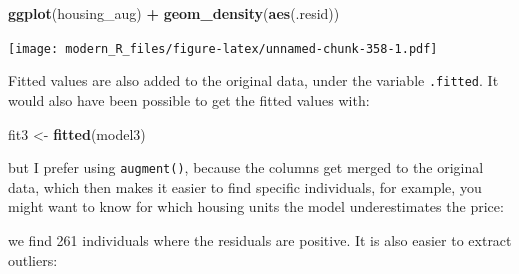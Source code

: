 \documentclass[]{gitbook}
\newenvironment{Shaded}{\begin{snugshade}}{\end{snugshade}}
\newcommand{\DataTypeTok}[1]{\textcolor[rgb]{0.13,0.29,0.53}{#1}}
\newcommand{\DecValTok}[1]{\textcolor[rgb]{0.00,0.00,0.81}{#1}}
\newcommand{\FloatTok}[1]{\textcolor[rgb]{0.00,0.00,0.81}{#1}}
\newcommand{\KeywordTok}[1]{\textcolor[rgb]{0.13,0.29,0.53}{\textbf{#1}}}
\newcommand{\NormalTok}[1]{#1}
\newcommand{\OperatorTok}[1]{\textcolor[rgb]{0.81,0.36,0.00}{\textbf{#1}}}
\newcommand{\StringTok}[1]{\textcolor[rgb]{0.31,0.60,0.02}{#1}}
\theoremstyle{definition}
\theoremstyle{definition}
\theoremstyle{definition}
\theoremstyle{remark}
\begin{document}
\begin{Shaded}
\begin{Highlighting}[]
\KeywordTok{ggplot}\NormalTok{(housing_aug) }\OperatorTok{+}
\StringTok{  }\KeywordTok{geom_density}\NormalTok{(}\KeywordTok{aes}\NormalTok{(.resid))}
\end{Highlighting}
\end{Shaded}

\texttt{[image: modern\_R\_files/figure-latex/unnamed-chunk-358-1.pdf]}

Fitted values are also added to the original data, under the variable
\texttt{.fitted}. It would also have been possible to get the fitted
values with:

\begin{Shaded}
\begin{Highlighting}[]
\NormalTok{fit3 <-}\StringTok{ }\KeywordTok{fitted}\NormalTok{(model3)}
\end{Highlighting}
\end{Shaded}

but I prefer using \texttt{augment()}, because the columns get merged to
the original data, which then makes it easier to find specific
individuals, for example, you might want to know for which housing units
the model underestimates the price:

\begin{Shaded}
\end{Shaded}

we find 261 individuals where the residuals are positive. It is also
easier to extract outliers:

\begin{Shaded}
\end{Shaded}
\end{document}
